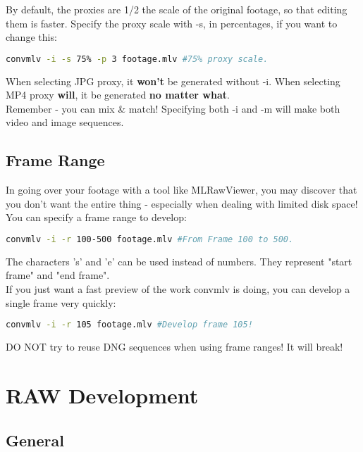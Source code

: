 \documentclass[a4paper,12pt]{article}
\begin{document}
		By default, the proxies are 1/2 the scale of the original footage, so that editing them is faster.
		Specify the proxy scale with -s, in percentages, if you want to change this:
	
\begin{lstlisting}[language=bash]
	convmlv -i -s 75% -p 3 footage.mlv #75% proxy scale.
\end{lstlisting}

		When selecting JPG proxy, it \textbf{won't} be generated without -i. When selecting MP4 proxy \textbf{will}, it
		be generated \textbf{no matter what}.\\
		
		Remember - you can mix \& match! Specifying both -i and -m will make both video and image sequences.

	\subsection{Frame Range}
		
		In going over your footage with a tool like MLRawViewer, you may discover that you don't want the entire thing - especially
		when dealing with limited disk space! You can specify a frame range to develop:
		
\begin{lstlisting}[language=bash]
	convmlv -i -r 100-500 footage.mlv #From Frame 100 to 500.
\end{lstlisting}

	The characters 's' and 'e' can be used instead of numbers. They represent "start frame" and "end frame".\\
	
	If you just want a fast preview of the work convmlv is doing, you can develop a single frame very quickly:
	
\begin{lstlisting}[language=bash]
	convmlv -i -r 105 footage.mlv #Develop frame 105!
\end{lstlisting}
	
	DO NOT try to reuse DNG sequences when using frame ranges! It will break!

\section{RAW Development}
	
	\subsection{General}
	
\end{document}
